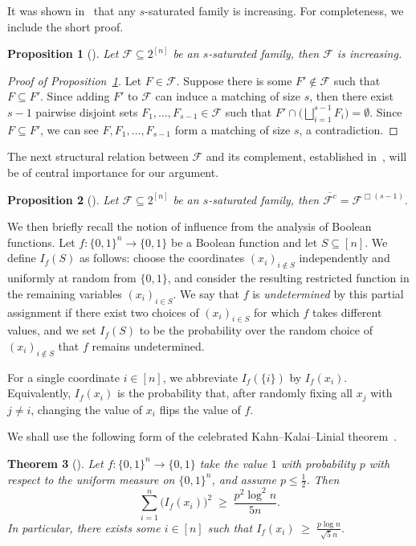 \documentclass[11pt]{article}
\newtheorem{theorem}{Theorem}[section]
\newtheorem{prop}[theorem]{Proposition}
\theoremstyle{definition}
\begin{document}
It was shown in~\cite{2018BLMS} that any \(s\)-saturated family is increasing. For completeness, we include the short proof.
\begin{prop}[\cite{2018BLMS}]\label{claim:Increasing}
Let \(\mathcal{F}\subseteq 2^{[n]}\) be an \(s\)-saturated family, then \(\mathcal{F}\) is increasing.
\end{prop}
\begin{proof}[Proof of Proposition~\ref{claim:Increasing}]
Let $F\in \mathcal{F}$. Suppose there is some $F'\notin \mathcal{F}$ such that \(F\subseteq F'\). Since adding \(F'\) to \(\mathcal{F}\) can induce a matching of size \(s\), then there exist $s-1$ pairwise disjoint sets $F_1,\ldots ,F_{s-1}\in\mathcal{F}$ such that $F'\cap\big(\bigsqcup_{i=1}^{s-1}F_i\big)=\emptyset$. Since \(F\subseteq F'\), we can see $F,F_1,\ldots,F_{s-1}$ form a matching of size \(s\), a contradiction.
\end{proof}
The next structural relation between \(\mathcal{F}\) and its complement, established in~\cite{2018BLMS}, will be of central importance for our argument.
\begin{prop}[\cite{2018BLMS}]\label{claim:RelationFG}
    Let \(\mathcal{F}\subseteq 2^{[n]}\) be an \(s\)-saturated family, then \(
    \overline{\mathcal{F}^{c}} = \mathcal{F}^{\Box (s-1)}.
    \)
\end{prop}
We then briefly recall the notion of influence from the analysis of Boolean functions. Let \(f:\{0,1\}^n\to\{0,1\}\) be a Boolean function and let \(S\subseteq [n]\).  
We define \(I_f(S)\) as follows: choose the coordinates \((x_i)_{i\notin S}\) independently and uniformly at random from \(\{0,1\}\), and consider the resulting restricted function in the remaining variables \((x_i)_{i\in S}\). We say that \(f\) is \emph{undetermined} by this partial assignment if there exist two choices of \((x_i)_{i\in S}\) for which \(f\) takes different values, and we set \(I_f(S)\) to be the probability over the random choice of \((x_i)_{i\notin S}\) that \(f\) remains undetermined.

For a single coordinate \(i\in[n]\), we abbreviate \(I_f(\{i\})\) by \(I_f(x_i)\). Equivalently, \(I_f(x_i)\) is the probability that, after randomly fixing all \(x_j\) with \(j\neq i\), changing the value of \(x_i\) flips the value of \(f\).

We shall use the following form of the celebrated Kahn--Kalai--Linial theorem~\cite{1988kahanKalaiLinial}.

\begin{theorem}[\cite{1988kahanKalaiLinial}]\label{lemma:Bool}
   Let \(f:\{0,1\}^n\to\{0,1\}\) take the value \(1\) with probability \(p\) with respect to the uniform measure on \(\{0,1\}^n\), and assume \(p\le \tfrac{1}{2}\). Then
   \[
      \sum_{i=1}^n \bigl(I_f(x_i)\bigr)^2
      \;\ge\;
      \frac{p^2\log^2 n}{5n}.
   \]
   In particular, there exists some \(i\in[n]\) such that
   \(
      I_f(x_i)\;\ge\; \frac{p\log n}{\sqrt{5}n}.
   \)
\end{theorem}
\end{document}
